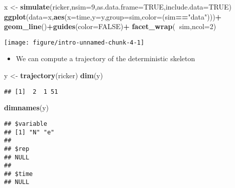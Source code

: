 \documentclass[]{article}
\newenvironment{Shaded}{\begin{snugshade}}{\end{snugshade}}
\newcommand{\KeywordTok}[1]{\textcolor[rgb]{0.13,0.29,0.53}{\textbf{#1}}}
\newcommand{\DataTypeTok}[1]{\textcolor[rgb]{0.13,0.29,0.53}{#1}}
\newcommand{\DecValTok}[1]{\textcolor[rgb]{0.00,0.00,0.81}{#1}}
\newcommand{\StringTok}[1]{\textcolor[rgb]{0.31,0.60,0.02}{#1}}
\newcommand{\OtherTok}[1]{\textcolor[rgb]{0.56,0.35,0.01}{#1}}
\newcommand{\OperatorTok}[1]{\textcolor[rgb]{0.81,0.36,0.00}{\textbf{#1}}}
\newcommand{\NormalTok}[1]{#1}
\providecommand{\tightlist}{%
  \setlength{\itemsep}{0pt}\setlength{\parskip}{0pt}}
\begin{document}
\begin{Shaded}
\begin{Highlighting}[]
\NormalTok{x <-}\StringTok{ }\KeywordTok{simulate}\NormalTok{(ricker,}\DataTypeTok{nsim=}\DecValTok{9}\NormalTok{,}\DataTypeTok{as.data.frame=}\OtherTok{TRUE}\NormalTok{,}\DataTypeTok{include.data=}\OtherTok{TRUE}\NormalTok{)}
\KeywordTok{ggplot}\NormalTok{(}\DataTypeTok{data=}\NormalTok{x,}\KeywordTok{aes}\NormalTok{(}\DataTypeTok{x=}\NormalTok{time,}\DataTypeTok{y=}\NormalTok{y,}\DataTypeTok{group=}\NormalTok{sim,}\DataTypeTok{color=}\NormalTok{(sim}\OperatorTok{==}\StringTok{"data"}\NormalTok{)))}\OperatorTok{+}
\StringTok{  }\KeywordTok{geom_line}\NormalTok{()}\OperatorTok{+}\KeywordTok{guides}\NormalTok{(}\DataTypeTok{color=}\OtherTok{FALSE}\NormalTok{)}\OperatorTok{+}
\StringTok{  }\KeywordTok{facet_wrap}\NormalTok{(}\OperatorTok{~}\NormalTok{sim,}\DataTypeTok{ncol=}\DecValTok{2}\NormalTok{)}
\end{Highlighting}
\end{Shaded}

\begin{center}\texttt{[image: figure/intro-unnamed-chunk-4-1]} \end{center}

\begin{itemize}
\tightlist
\item
  We can compute a trajectory of the deterministic skeleton
\end{itemize}

\begin{Shaded}
\begin{Highlighting}[]
\NormalTok{y <-}\StringTok{ }\KeywordTok{trajectory}\NormalTok{(ricker)}
\KeywordTok{dim}\NormalTok{(y)}
\end{Highlighting}
\end{Shaded}

\begin{verbatim}
## [1]  2  1 51
\end{verbatim}

\begin{Shaded}
\begin{Highlighting}[]
\KeywordTok{dimnames}\NormalTok{(y)}
\end{Highlighting}
\end{Shaded}

\begin{verbatim}
## $variable
## [1] "N" "e"
## 
## $rep
## NULL
## 
## $time
## NULL
\end{verbatim}
\end{document}
